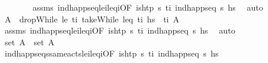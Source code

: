 \begin{isabellebody}
\ \ \ \ \ \ \isamarkupfalse%
\ assms\ ind{\isacharunderscore}{\kern0pt}happ{\isacharunderscore}{\kern0pt}seq{\isacharunderscore}{\kern0pt}le\isactrlsub i{\isacharunderscore}{\kern0pt}leq\isactrlsub i{\isacharbrackleft}{\kern0pt}OF\ {\isacartoucheopen}is{\isacharunderscore}{\kern0pt}htp\ {\isasympi}s\ t\isactrlsub i{\isacartoucheclose}\ {\isacartoucheopen}ind{\isacharunderscore}{\kern0pt}happ{\isacharunderscore}{\kern0pt}seq\ {\isasympi}s\ hs\ \isamarkupfalse%
\ auto\isanewline
\ \ \ \ \isamarkupfalse%
\ A\ \ {\isachardoublequoteopen}dropWhile\ {\isacharparenleft}{\kern0pt}le\ t\isactrlsub i{\isacharparenright}{\kern0pt}\ {\isacharparenleft}{\kern0pt}takeWhile\ {\isacharparenleft}{\kern0pt}leq\ t\isactrlsub i{\isacharparenright}{\kern0pt}\ hs\ {\isacharequal}{\kern0pt}\ {\isacharbrackleft}{\kern0pt}{\isacharparenleft}{\kern0pt}t\isactrlsub i{\isacharcomma}{\kern0pt}\ A\isanewline
\ \ \ \ \ \ \isamarkupfalse%
\ assms\ ind{\isacharunderscore}{\kern0pt}happ{\isacharunderscore}{\kern0pt}seq{\isacharunderscore}{\kern0pt}le\isactrlsub i{\isacharunderscore}{\kern0pt}leq\isactrlsub i{\isacharbrackleft}{\kern0pt}OF\ {\isacartoucheopen}is{\isacharunderscore}{\kern0pt}htp\ {\isasympi}s\ t\isactrlsub i{\isacartoucheclose}\ {\isacartoucheopen}ind{\isacharunderscore}{\kern0pt}happ{\isacharunderscore}{\kern0pt}seq\ {\isasympi}s\ hs\ \isamarkupfalse%
\ auto\isanewline
\ \ \ \ \isamarkupfalse%
\ {\isachardoublequoteopen}set\ A\ {\isacharequal}{\kern0pt}\ set\ A\isanewline
\ \ \ \ \ \ \isamarkupfalse%
\ ind{\isacharunderscore}{\kern0pt}happ{\isacharunderscore}{\kern0pt}seqs{\isacharunderscore}{\kern0pt}same{\isacharunderscore}{\kern0pt}acts{\isacharunderscore}{\kern0pt}le\isactrlsub i{\isacharunderscore}{\kern0pt}leq\isactrlsub i{\isacharbrackleft}{\kern0pt}OF\ {\isacartoucheopen}is{\isacharunderscore}{\kern0pt}htp\ {\isasympi}s\ t\isactrlsub i{\isacartoucheclose}\ {\isacartoucheopen}ind{\isacharunderscore}{\kern0pt}happ{\isacharunderscore}{\kern0pt}seq\ {\isasympi}s\ hs\isanewline

\end{isabellebody}
